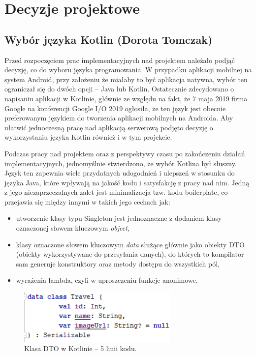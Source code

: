 \documentclass[10pt,twoside,a4paper]{report}
\begin{document}
\chapter{Decyzje projektowe}

\section{Wybór języka Kotlin (Dorota Tomczak)}
\par Przed rozpoczęciem prac implementacyjnych nad projektem należało podjąć decyzję, co do wyboru języka programowania. W przypadku aplikacji mobilnej na system Android, przy założeniu że miałaby to być aplikacja natywna, wybór ten ograniczał się do dwóch opcji – Java lub Kotlin. Ostatecznie zdecydowano o napisaniu aplikacji w Kotlinie, głównie ze względu na fakt, że 7 maja 2019 firma Google na konferencji Google I/O 2019 ogłosiła, że ten język jest obecnie preferowanym językiem do tworzenia aplikacji mobilnych na Androida\cite{Google I/O 2019}. Aby ułatwić jednoczesną pracę nad aplikacją serwerową podjęto decyzję o wykorzystaniu języka Kotlin również i w tym projekcie.
\par Podczas pracy nad projektem oraz z perspektywy czasu po zakończeniu działań implementacyjnych, jednomyślnie stwierdzono, że wybór Kotlina był słuszny. Język ten zapewnia wiele przydatnych udogodnień i ulepszeń w stosunku do języka Java, które wpływają na jakość kodu i satysfakcję z pracy nad nim. Jedną z jego niezaprzeczalnych zalet jest minimalizacja tzw. kodu boilerplate, co przejawia się między innymi w takich jego cechach jak: 

\begin{itemize}
\item utworzenie klasy typu Singleton jest jednoznaczne z dodaniem klasy oznaczonej słowem kluczowym \textit{object},
\item klasy oznaczone słowem kluczowym \textit{data} służące głównie jako obiekty DTO (obiekty wykorzystywane do przesyłania danych), do których to kompilator sam generuje konstruktory oraz metody dostępu do wszystkich pól,
\item wyrażenia lambda, czyli w uproszczeniu funkcje anonimowe.
\end{itemize}

\begin{figure}[h]
\centering
\includegraphics[width=0.7\textwidth]{dtoKotlin}
\caption{Klasa DTO w Kotlinie -- 5 linii kodu.}
\label{fig:dtoKotlin}
\end{figure}
\FloatBarrier
\end{document}
